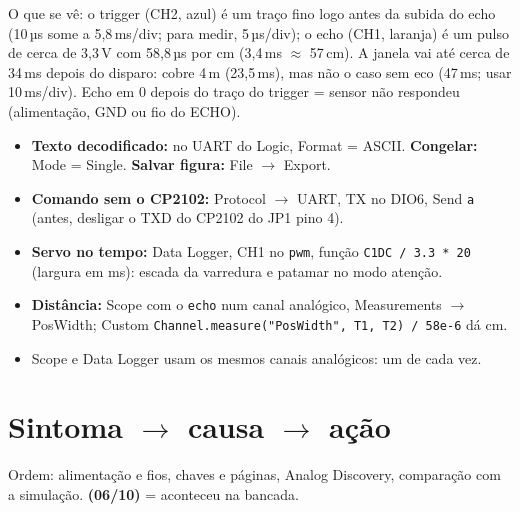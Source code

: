 \documentclass[9pt,a4paper]{extarticle}
\newcommand{\s}[1]{\texttt{#1}}          %
\newcommand{\bancada}{\textcolor{red!70!black}{\textbf{(06/10)}}}
\begin{document}
O que se vê: o trigger (CH2, azul) é um traço fino logo antes da subida do echo
(10\,µs some a 5,8\,ms/div; para medir, 5\,µs/div); o echo (CH1, laranja) é um
pulso de cerca de 3,3\,V com 58,8\,µs por cm (3,4\,ms $\approx$ 57\,cm). A janela
vai até cerca de 34\,ms depois do disparo: cobre 4\,m (23,5\,ms), mas não o caso sem
eco (47\,ms; usar 10\,ms/div). Echo em 0 depois do traço do trigger = sensor não
respondeu (alimentação, GND ou fio do ECHO).

\begin{itemize}
  \item \textbf{Texto decodificado:} no UART do Logic, Format = ASCII.
        \textbf{Congelar:} Mode = Single. \textbf{Salvar figura:} File $\to$ Export.
  \item \textbf{Comando sem o CP2102:} Protocol $\to$ UART, TX no DIO6, Send \s{a}
        (antes, desligar o TXD do CP2102 do JP1 pino 4).
  \item \textbf{Servo no tempo:} Data Logger, CH1 no \s{pwm}, função \s{C1DC / 3.3 * 20}
        (largura em ms): escada da varredura e patamar no modo atenção.
  \item \textbf{Distância:} Scope com o \s{echo} num canal analógico, Measurements
        $\to$ PosWidth; Custom \s{Channel.measure("PosWidth", T1, T2) / 58e-6} dá cm.
  \item Scope e Data Logger usam os mesmos canais analógicos: um de cada vez.
\end{itemize}

\section{Sintoma $\to$ causa $\to$ ação}

Ordem: alimentação e fios, chaves e páginas, Analog Discovery, comparação com a
simulação. \bancada{} = aconteceu na bancada.
\end{document}
